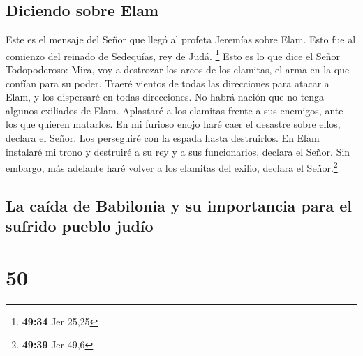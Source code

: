 \hypertarget{diciendo-sobre-elam}{%
\subsection{Diciendo sobre Elam}\label{diciendo-sobre-elam}}

 Este es el mensaje del Señor que llegó al profeta
Jeremías sobre Elam. Esto fue al comienzo del reinado de Sedequías, rey
de Judá. \footnote{\textbf{49:34} Jer 25,25}  Esto es lo
que dice el Señor Todopoderoso: Mira, voy a destrozar los arcos de los
elamitas, el arma en la que confían para su poder. 
Traeré vientos de todas las direcciones para atacar a Elam, y los
dispersaré en todas direcciones. No habrá nación que no tenga algunos
exiliados de Elam.  Aplastaré a los elamitas frente a sus
enemigos, ante los que quieren matarlos. En mi furioso enojo haré caer
el desastre sobre ellos, declara el Señor. Los perseguiré con la espada
hasta destruirlos.  En Elam instalaré mi trono y
destruiré a su rey y a sus funcionarios, declara el Señor.
 Sin embargo, más adelante haré volver a los elamitas del
exilio, declara el Señor.\footnote{\textbf{49:39} Jer 49,6}

\hypertarget{la-cauxedda-de-babilonia-y-su-importancia-para-el-sufrido-pueblo-juduxedo}{%
\subsection{La caída de Babilonia y su importancia para el sufrido
pueblo
judío}\label{la-cauxedda-de-babilonia-y-su-importancia-para-el-sufrido-pueblo-juduxedo}}

\hypertarget{section-49}{%
\section{50}\label{section-49}}

